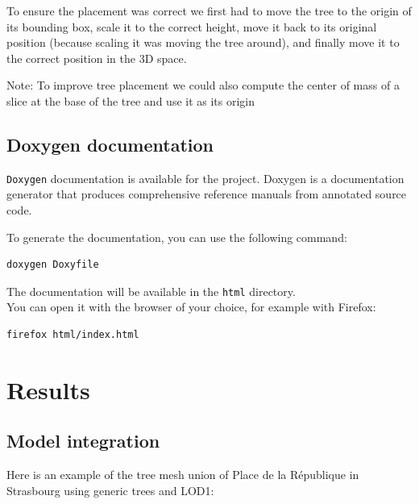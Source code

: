 \documentclass[12pt]{article}
\begin{document}
To ensure the placement was correct we first had to move the tree to the origin
of its bounding box, scale it to the correct height, move it back to its original position
(because scaling it was moving the tree around), and finally move it to the correct position in the 3D space.

Note: To improve tree placement we could also compute the center of mass of a slice
at the base of the tree and use it as its origin

\subsection{Doxygen documentation}

\texttt{Doxygen}\cite{doxygen} documentation is available for the project. Doxygen is a
documentation generator that produces comprehensive reference manuals from
annotated source code.

To generate the documentation, you can use the following command:

\begin{lstlisting}[language=bash]
doxygen Doxyfile
\end{lstlisting}

The documentation will be available in the \texttt{html} directory.\\
You can open it with the browser of your choice, for example with Firefox:

\begin{lstlisting}[language=bash]
firefox html/index.html
\end{lstlisting}

\newpage

\section{Results}
\label{sec:Results}
\subsection{Model integration}

Here is an example of the tree mesh union of Place de la République in Strasbourg
using generic trees and LOD1:
\end{document}
